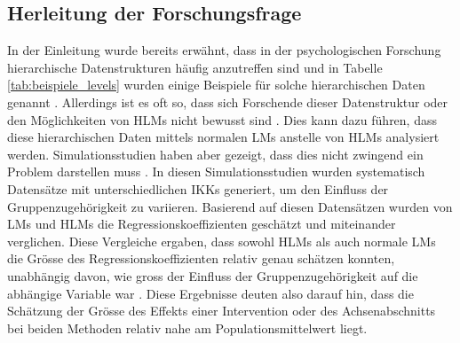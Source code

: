 \documentclass[12pt]{article}\usepackage[]{graphicx}\usepackage[]{color}
\begin{document}
\subsection{Herleitung der Forschungsfrage}
In der Einleitung wurde bereits erwähnt, dass in der psychologischen Forschung hierarchische Datenstrukturen häufig anzutreffen sind und in Tabelle \ref{tab:beispiele_levels} wurden einige Beispiele für solche hierarchischen Daten genannt \citep{raudenbush2002hierarchical,SnijdersTomA.B2012Ma:a,woltman2012introduction}. Allerdings ist es oft so, dass sich Forschende dieser Datenstruktur oder den Möglichkeiten von HLMs nicht bewusst sind \citep{mcneish2014analyzing}. Dies kann dazu führen, dass diese hierarchischen Daten mittels normalen LMs anstelle von HLMs analysiert werden. Simulationsstudien haben aber gezeigt, dass dies nicht zwingend ein Problem darstellen muss \citep{mcneish2014analyzing, mundfrom2002monte}. In diesen Simulationsstudien wurden systematisch Datensätze mit unterschiedlichen IKKs generiert, um den Einfluss der Gruppenzugehörigkeit zu variieren. Basierend auf diesen Datensätzen wurden von LMs und HLMs die Regressionskoeffizienten geschätzt und miteinander verglichen. Diese Vergleiche ergaben, dass sowohl HLMs als auch normale LMs die Grösse des Regressionskoeffizienten relativ genau schätzen konnten, unabhängig davon, wie gross der Einfluss der Gruppenzugehörigkeit auf die abhängige Variable war  \citep{mcneish2014analyzing, mundfrom2002monte}. Diese Ergebnisse deuten also darauf hin, dass die Schätzung der Grösse des Effekts einer Intervention oder des Achsenabschnitts bei beiden Methoden relativ nahe am Populationsmittelwert liegt.
\end{document}
